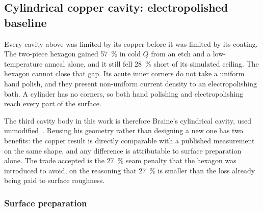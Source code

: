 \subsection{Cylindrical copper cavity: electropolished baseline}\label{sec:cylcu}
%
%
%

Every cavity above was limited by its copper before it was limited by its coating. The two-piece hexagon gained \qty{57}{\percent} in cold $Q$ from an etch and a low-temperature anneal alone, and it still fell \qty{28}{\percent} short of its simulated ceiling. The hexagon cannot close that gap. Its acute inner corners do not take a uniform hand polish, and they present non-uniform current density to an electropolishing bath. A cylinder has no corners, so both hand polishing and electropolishing reach every part of the surface.

The third cavity body in this work is therefore Braine's cylindrical cavity, used unmodified~\cite{Braine:2024nzi}. Reusing his geometry rather than designing a new one has two benefits: the copper result is directly comparable with a published measurement on the same shape, and any difference is attributable to surface preparation alone. The trade accepted is the \qty{27}{\percent} seam penalty that the hexagon was introduced to avoid, on the reasoning that \qty{27}{\percent} is smaller than the loss already being paid to surface roughness.


\subsubsection{Surface preparation}

